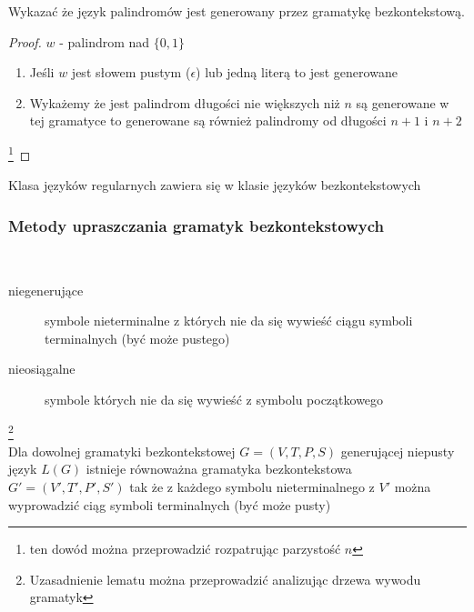 	
	\begin{przyklad}
		Wykazać że język palindromów jest generowany przez gramatykę bezkontekstową.
	\begin{proof}
		$w$ - palindrom nad $\{0,1\}$ \\
		\begin{enumerate}
			\item Jeśli $w$ jest słowem pustym ($\epsilon$) lub jedną literą to jest generowane
			\item Wykażemy że jest palindrom długości nie większych niż $n$ są generowane w tej gramatyce to
			generowane są również palindromy od długości $n+1$ i $n+2$\\
		\end{enumerate}\footnote{ten dowód można przeprowadzić rozpatrując parzystość $n$}
	\end{proof}
	\end{przyklad}		
	
	\begin{tw}
	Klasa języków regularnych zawiera się w klasie języków bezkontekstowych
	\end{tw}
	
	\subsubsection{Metody upraszczania gramatyk bezkontekstowych}
	
	\begin{df}~\\
		\begin{description}
			\item[niegenerujące] symbole nieterminalne z których nie da się wywieść ciągu symboli terminalnych (być może pustego)
			\item[nieosiągalne] symbole których nie da się wywieść z symbolu początkowego
		\end{description}				
	\end{df}	
	
	\begin{lemat}\footnote{Uzasadnienie lematu można przeprowadzić analizując drzewa wywodu gramatyk}~\\
		Dla dowolnej gramatyki bezkontekstowej $G = (V, T, P, S)$ generującej niepusty język $L(G)$ istnieje równoważna gramatyka
		bezkontekstowa $G' = (V', T', P', S')$ tak że z każdego symbolu nieterminalnego z $V'$ można wyprowadzić ciąg symboli terminalnych (być może pusty)
	\end{lemat}	
	
